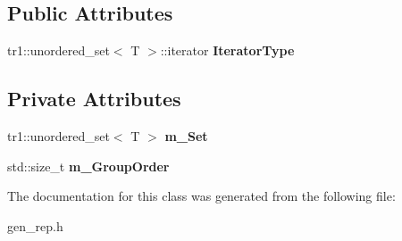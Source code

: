\subsection*{Public Attributes}
\begin{DoxyCompactItemize}
\item 
\hypertarget{classcGenRep_a94b066c9b99401b112085195c278b827}{tr1\-::unordered\-\_\-set$<$ T $>$\-::iterator {\bfseries Iterator\-Type}}\label{classcGenRep_a94b066c9b99401b112085195c278b827}

\end{DoxyCompactItemize}
\subsection*{Private Attributes}
\begin{DoxyCompactItemize}
\item 
\hypertarget{classcGenRep_af17e2ed953897003c229919293f6ecad}{tr1\-::unordered\-\_\-set$<$ T $>$ {\bfseries m\-\_\-\-Set}}\label{classcGenRep_af17e2ed953897003c229919293f6ecad}

\item 
\hypertarget{classcGenRep_aa7a645384a9a6036b4d860404557b88f}{std\-::size\-\_\-t {\bfseries m\-\_\-\-Group\-Order}}\label{classcGenRep_aa7a645384a9a6036b4d860404557b88f}

\end{DoxyCompactItemize}


The documentation for this class was generated from the following file\-:\begin{DoxyCompactItemize}
\item 
gen\-\_\-rep.\-h\end{DoxyCompactItemize}
